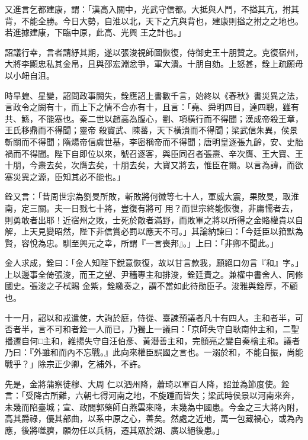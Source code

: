 \begin{pinyinscope}
 又進言乞都建康，謂：「漢高入關中，光武守信都。大抵與人鬥，不搤其亢，拊其背，不能全勝。今日大勢，自淮以北，天下之亢與背也，建康則搤之拊之之地也。若進據建康，下臨中原，此高、光興
 王之計也。」



 詔議行幸，言者請紓其期，遂以張浚視師圖恢復，侍御史王十朋贊之。克復宿州，大將李顯忠私其金帛，且與邵宏淵忿爭，軍大潰。十朋自劾。上怒甚，銓上疏願毋以小衄自沮。



 時旱蝗、星變，詔問政事闕失，銓應詔上書數千言，始終以《春秋》書災異之法，言政令之闕有十，而上下之情不合亦有十，且言：「堯、舜明四目，達四聰，雖有共、鯀，不能塞也。秦二世以趙高為腹心，劉、項橫行而不得聞；漢成帝殺王章，王氏移鼎而不得聞；靈帝
 殺竇武、陳蕃，天下橫潰而不得聞；梁武信朱異，侯景斬關而不得聞；隋煬帝信虞世基，李密稱帝而不得聞；唐明皇逐張九齡，安、史胎禍而不得聞。陛下自即位以來，號召逐客，與臣同召者張燾、辛次膺、王大寶、王十朋，今燾去矣，次膺去矣，十朋去矣，大寶又將去，惟臣在爾。以言為諱，而欲塞災異之源，臣知其必不能也。」



 銓又言：「昔周世宗為劉旻所敗，斬敗將何徽等七十人，軍威大震，果敗旻，取淮南，定三關。夫一日戮七十將，豈復有將可
 用？而世宗終能恢復，非庸懦者去，則勇敢者出耶！近宿州之敗，士死於敵者滿野，而敗軍之將以所得之金賂權貴以自解，上天見變昭然，陛下非信賞必罰以應天不可。」其論納諫曰：「今廷臣以箝默為賢，容悅為忠。馴至興元之幸，所謂『一言喪邦』。」上曰：「非卿不聞此。」



 金人求成，銓曰：「金人知陛下銳意恢復，故以甘言款我，願絕口勿言『和』字。」上以邊事全倚張浚，而王之望、尹穡專主和排浚，銓廷責之。兼權中書舍人、同修國史。張浚之子栻賜
 金紫，銓繳奏之，謂不當如此待勛臣子。浚雅與銓厚，不顧也。



 十一月，詔以和戎遣使，大詢於庭，侍從、臺諫預議者凡十有四人。主和者半，可否者半，言不可和者銓一人而已，乃獨上一議曰：「京師失守自耿南仲主和，二聖播遷自何□主和，維揚失守自汪伯彥、黃潛善主和，完顏亮之變自秦檜主和。議者乃曰：『外雖和而內不忘戰。』此向來權臣誤國之言也。一溺於和，不能自振，尚能戰乎？」除宗正少卿，乞補外，不許。



 先是，金將蒲察徒穆、大周
 仁以泗州降，蕭琦以軍百人降，詔並為節度使。銓言：「受降古所難，六朝七得河南之地，不旋踵而皆失；梁武時侯景以河南來奔，未幾而陷臺城；宣、政間郭藥師自燕雲來降，未幾為中國患。今金之三大將內附，高其爵祿，優其部曲，以系中原之心，善矣。然處之近地，萬一包藏禍心，或為內應，後將噬臍，願勿任以兵柄，遷其眾於湖、廣以絕後患。」




\end{pinyinscope}
